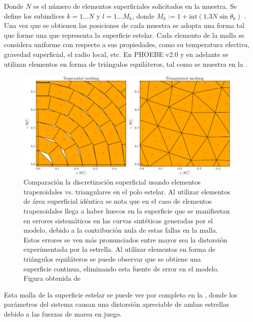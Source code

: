Donde $N$ es el número de elementos superficiales solicitados en la muestra. Se
define los subindices $k = 1 \dots N$ y $l = 1 \dots M_k$, donde $M_k := 1 +
\mathrm{int}\left(1.3 N \sin{\theta_k}\right)$
. Una vez que se obtienen las
posiciones de cada muestra se adopta una forma tal que forme una 
que representa la superficie estelar. Cada elemento de la malla se considera
uniforme con respecto a sus propiedades, como su temperatura efectiva, gravedad
superficial, el radio local, etc. En PHOEBE v2.0 y en adelante se utilizan
elementos en forma de triángulos equiláteros, tal como se muestra en la
. 

\begin{figure}[!ht]
	\includegraphics[scale=0.45]{Introduccion/Figures/Figura Mallado Triangular_PHOEBE II Mesh.png}
	\caption{Comparación la discretización superficial usando elementos
	trapezoidales vs. triangulares en el polo estelar. Al utilizar elementos de
	área superficial idéntica se nota que en el caso de elementos trapezoidales
	llega a haber huecos en la superficie que se manifiestan en errores
	sistemáticos en las curvas sintéticas generadas por el modelo, debido a la
	contribución nula de estas fallas en la malla. Estos errores se ven más
	pronunciados entre mayor sea la distorsión experimentada por la estrella. Al
	utilizar elementos en forma de triángulos equiláteros se puede observar que
	se obtiene una superficie continua, eliminando esta fuente de error en el
	modelo. Figura obtenida de
	}
	\label{figuraMallaPhoebe}
\end{figure}

Esta malla de la superficie estelar se puede ver por completo en la
, donde los parámetros del sistema causan una
distorsión apreciable de ambas estrellas debido a las fuerzas de marea en juego.

